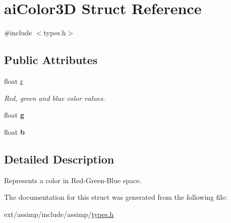 \hypertarget{structai_color3_d}{\section{ai\-Color3\-D Struct Reference}
\label{structai_color3_d}
}


{\ttfamily \#include $<$types.\-h$>$}

\subsection*{Public Attributes}
\begin{DoxyCompactItemize}
\item 
\hypertarget{structai_color3_d_a0ff704458aa26c84bbfe93b2dd89c630}{float \hyperlink{structai_color3_d_a0ff704458aa26c84bbfe93b2dd89c630}{r}}\label{structai_color3_d_a0ff704458aa26c84bbfe93b2dd89c630}

\begin{DoxyCompactList}\small\item\em Red, green and blue color values. \end{DoxyCompactList}\item 
\hypertarget{structai_color3_d_a40ecdcee92b5373cbaa5e00ebcdb2cfb}{float {\bfseries g}}\label{structai_color3_d_a40ecdcee92b5373cbaa5e00ebcdb2cfb}

\item 
\hypertarget{structai_color3_d_a02ddcc7af11f7d4d6ea14f1bfb4ef6c7}{float {\bfseries b}}\label{structai_color3_d_a02ddcc7af11f7d4d6ea14f1bfb4ef6c7}

\end{DoxyCompactItemize}


\subsection{Detailed Description}
Represents a color in Red-\/\-Green-\/\-Blue space. 

The documentation for this struct was generated from the following file\-:\begin{DoxyCompactItemize}
\item 
ext/assimp/include/assimp/\hyperlink{types_8h}{types.\-h}\end{DoxyCompactItemize}
